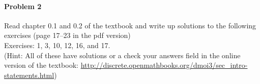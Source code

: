\documentclass[11pt]{article} %
\begin{document}
	\paragraph{Problem 2} Read chapter 0.1 and 0.2 of the textbook and write up solutions to the following exercises (page 17--23 in the pdf version)\\
	
	Exercises: 1, 3, 10, 12, 16, and 17.\\
	
	(Hint: All of these have solutions or a check your answers field in the online version of the textbook: \url{http://discrete.openmathbooks.org/dmoi3/sec_intro-statements.html})
		
	
\end{document}
